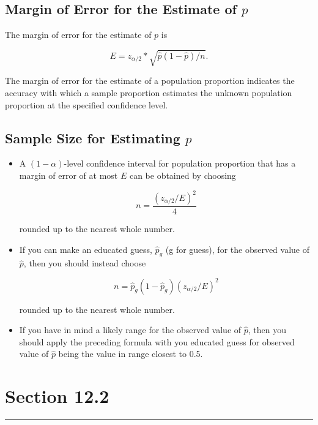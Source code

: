 \documentclass[12pt]{article}
\begin{document}
        \subsection*{Margin of Error for the Estimate of $p$}
            The margin of error for the estimate of $p$ is
            \begin{center}
                \[
                    E = z_{\alpha/2}*\sqrt{\hat{p}(1-\hat{p})/n}.
                \]
            \end{center}
            The margin of error for the estimate of a population proportion indicates the
            accuracy with which a sample proportion estimates the unknown population
            proportion at the specified confidence level.
        \subsection*{Sample Size for Estimating $p$}
            \begin{itemize}
                \item A $(1-\alpha)$-level confidence interval for population proportion
                that has a margin of error of at most $E$ can be obtained by choosing
                \begin{center}
                    \[
                        n = \frac{(z_{\alpha/2}/E)^2}{4}   
                    \]
                \end{center}
                rounded up to the nearest whole number.
                \item If you can make an educated guess, $\hat{p}_g$ (g for guess), for
                the observed value of $\hat{p}$, then you should instead choose
                \begin{center}
                    \[
                        n = \hat{p}_g(1-\hat{p}_g)(z_{\alpha/2}/E)^2
                    \]
                \end{center}
                rounded up to the nearest whole number. 
                \item If you have in mind a likely range for the observed value of 
                $\hat{p}$, then you should apply the preceding formula with you educated
                guess for observed value of $\hat{p}$ being the value in range closest to
                0.5.
            \end{itemize}

    \section*{Section 12.2}
    \noindent\rule{\textwidth}{0.4pt}
\end{document}

